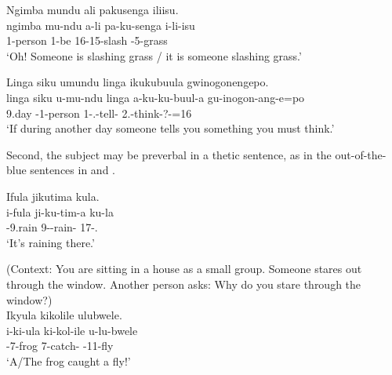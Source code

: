 \documentclass[output=paper]{langscibook}
\begin{document}
\ea
\label{bkm:Ref105351277}
Ngimba mundu ali pakusenga iliisu.\\
\gll
ngimba  mu-ndu  a-li  pa-ku-senga  i-li-isu\\
\EXCLAM{}  1-person  1\SM{}-be  16-15-slash  \AUG{}-5-grass\\
\glt
‘Oh! Someone is slashing grass / it is someone slashing grass.’\\

\z


\ea
\label{bkm:Ref105351278}
Linga siku umundu linga ikukubuula gwinogonengepo.\\
\gll
linga  siku  u-mu-ndu  linga  a-ku-ku-buul-a  gu-inogon-ang-e=po\\
\COND{}  9.day  \AUG{}-1-person  \COND{}  1\SM-\SG.\OM{}-tell-\FV{}  2\SG.\SM{}-think-?-\SBJV{}=16\\
\glt
‘If during another day someone tells you something you must think.’\\

\z


Second, the subject may be preverbal in a thetic sentence, as in the out-of-the-blue sentences in  and .

\ea
\label{bkm:Ref90303738}
Ifula jikutima kula.\\
\gll
i-fula  ji-ku-tim-a  ku-la\\
\AUG{}-9.rain  9\SM-\PRS{}-rain-\FV{}  17-\DEM.\DIST{}\\
\glt
‘It’s raining there.’\\

\z

\ea
\label{bkm:Ref90303744}
(Context: You are sitting in a house as a small group. Someone stares out through the window.
Another person asks: Why do you stare through the window?)\\
Ikyula kikolile ulubwele.\\
\gll
i-ki-ula  ki-kol-ile  u-lu-bwele\\
\AUG{}-7-frog  7\SM{}-catch-\PFV{} \AUG{}-11-fly\\
\glt ‘A/The frog caught a fly!' \citep[13]{KerrEtAl2023}\\
\z
\end{document}

